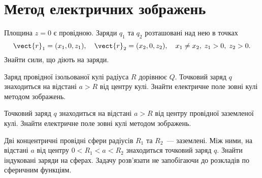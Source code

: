 \section{Метод електричних зображень}

\begin{problem}
Площина $z = 0$  є провідною. Заряди $q_1$ та $q_2$ розташовані над нею в точках
\[
	\vect{r}_1 = (x_1, 0, z_1), \quad  \vect{r}_2 = (x_2, 0, z_2), \quad x_1 \ne x_2,\; z_1  > 0, \; z_2  > 0.
\]
Знайти сили, що діють на заряди.

\end{problem}

\begin{problem}
Заряд провідної ізольованої кулі радіуса $R$  дорівнює $Q$. Точковий заряд $q$ знаходиться на відстані  $a > R$ від центру кулі. Знайти електричне поле зовні кулі методом зображень.
\end{problem}

\begin{problem}
Точковий заряд $q$ знаходиться на відстані  $a > R$ від центру провідної заземленої кулі. Знайти електричне поле зовні кулі методом зображень.
\end{problem}

%
%

\begin{problem}
Дві концентричні провідні сфери радіусів  $R_1$ та $R_2$~--- заземлені. Між ними, на відстані $a$  від центру $0< R_1<a<R_2$  знаходиться точковий заряд  $q$. Знайти індуковані заряди на сферах. Задачу розв'язати не запобігаючи до розкладів по сферичним функціям.
\end{problem}

